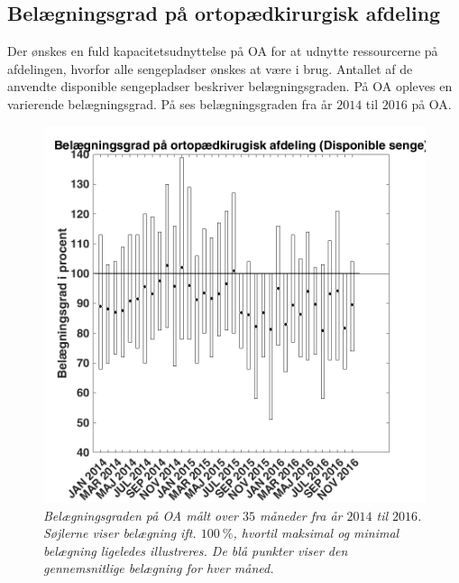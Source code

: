 \subsection{Belægningsgrad på ortopædkirurgisk afdeling}\label{omfang}
Der ønskes en fuld kapacitetsudnyttelse på OA for at udnytte ressourcerne på afdelingen, hvorfor alle sengepladser ønskes at være i brug. Antallet af de anvendte disponible sengepladser beskriver belægningsgraden. På OA opleves en varierende belægningsgrad. På  ses belægningsgraden fra år $2014$ til $2016$ på OA.\cite{SDS2015}

\begin{figure}[H]
	\flushleft 
	\centering
	\includegraphics[scale=.45]{figures/belaegningsgradny.png}
	\flushleft
	\caption{\textit{Belægningsgraden på OA målt over $35$ måneder fra år $2014$ til $2016$. Søjlerne viser belægning ift. $100~\%$, hvortil maksimal og minimal belægning ligeledes illustreres. De blå punkter viser den gennemsnitlige belægning for hver måned.}\cite{SDS2015}}
	\label{maxminbelaeg}
\end{figure}

